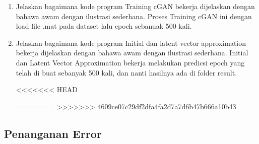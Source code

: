\begin{enumerate}
    \item Jelaskan bagaimana kode program Training cGAN bekerja dijelaskan dengan bahawa awam dengan ilustrasi sederhana.
    Proses Training cGAN ini dengan load file .mat pada dataset lalu epoch sebanuak 500 kali.

	

    \item Jelaskan bagaimana kode program Initial dan latent vector approximation bekerja dijelaskan dengan bahawa awam dengan ilustrasi sederhana.
    Initial dan Latent Vector Approximation bekerja melakukan predicsi epoch yang telah di buat sebanyak 500 kali, dan nanti hasilnya ada di folder result.

	

<<<<<<< HEAD
		

=======
>>>>>>> 4609ce07c29df2dfa4fa2d7a7d6b47b666a10b43
\end{enumerate}

\subsection{Penanganan Error}

